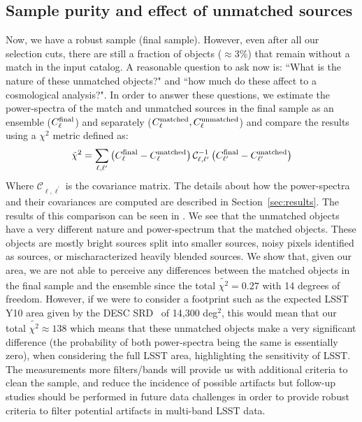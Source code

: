 \documentclass[twocolumn]{aastex62}
\begin{document}
\subsection{Sample purity and effect of unmatched sources}
Now, we have a robust sample (final sample). However, even after all our selection cuts, there are still a fraction of objects ($\approx 3\%$) that remain without a match in the input catalog. A reasonable question to ask now is: ``What is the nature of these unmatched objects?" and ``how much do these affect to a cosmological analysis?". In order to answer these questions, we estimate the power-spectra of the match and unmatched sources in the final sample as an ensemble ($C_{\ell}^{\rm{final}}$) and separately ($C_{\ell}^{\rm{matched}}, C_{\ell}^{\rm{unmatched}}$) and compare the results using a $\chi^{2}$ metric defined as: 
\begin{equation}
\tilde{\chi}^{2} = \sum_{\ell,\ell^{\prime}} \left(C_{\ell}^{\rm{final}}-C_{\ell}^{\rm{matched}}\right) \mathcal{C}_{\ell, \ell^{\prime}}^{-1}  \left(C_{\ell^{\prime}}^{\rm{final}}-C_{\ell^{\prime}}^{\rm{matched}}\right)
\end{equation} 
Where $\mathcal{C}_{\ell,\ell^{\prime}}$ is the covariance matrix. The details about how the power-spectra and their covariances are computed are described in Section~\ref{sec:results}. The results of this comparison can be seen in . We see that the unmatched objects have a very different nature and power-spectrum that the matched objects. These objects are mostly bright sources split into smaller sources, noisy pixels identified as sources, or mischaracterized heavily blended sources. We show that, given our area, we are not able to perceive any differences between the matched objects in the final sample and the ensemble since the total $\tilde{\chi^{2}}=0.27$ with 14 degrees of freedom. However, if we were to consider a footprint such as the expected LSST Y10 area given by the DESC SRD~\citep{2018arXiv180901669T} of 14,300 deg$^{2}$, this would mean that our total $\tilde{\chi^{2}} \approx 138$ which means that these unmatched objects make a very significant difference (the probability of both power-spectra being the same is essentially zero), when considering the full LSST area, highlighting the sensitivity of LSST. The measurements more filters/bands will provide us with additional criteria to clean the sample, and reduce the incidence of possible artifacts but follow-up studies should be performed in future data challenges in order to provide robust criteria to filter potential artifacts in multi-band LSST data.
\end{document}
